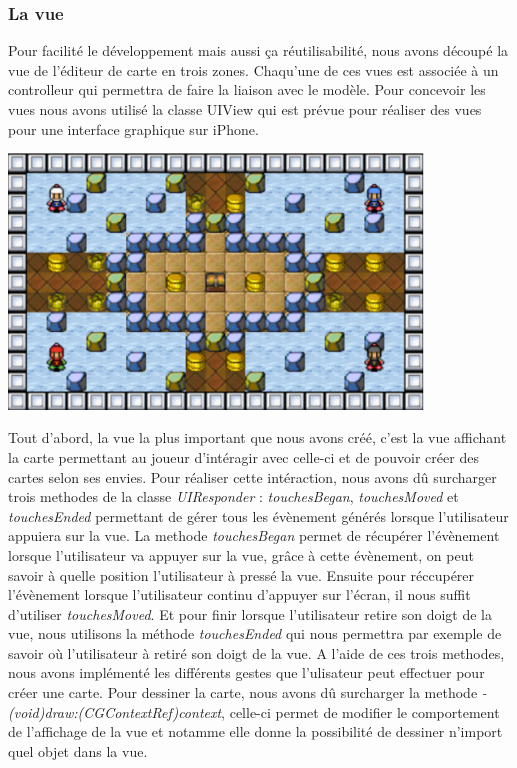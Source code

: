 	\subsubsection{La vue}
		Pour facilité le développement mais aussi ça réutilisabilité, nous avons découpé la vue de l'éditeur de carte en trois zones. Chaqu'une de ces vues est associée à un controlleur qui permettra de faire la liaison avec le modèle. Pour concevoir les vues nous avons utilisé la classe UIView qui est prévue pour réaliser des vues pour une interface graphique sur iPhone. 
			
		\begin{center}
			\includegraphics[width=11cm]{./Developpement/Img/carte.eps}
		\end{center}
		Tout d'abord, la vue la plus important que nous avons créé, c'est la vue affichant la carte permettant au joueur d'intéragir avec celle-ci et de pouvoir créer des cartes selon ses envies. Pour réaliser cette intéraction, nous avons dû surcharger trois methodes de la classe \textit{UIResponder} : \textit{touchesBegan}, \textit{touchesMoved} et \textit{touchesEnded} permettant de gérer tous les évènement générés lorsque l'utilisateur appuiera sur la vue. La methode \textit{touchesBegan} permet de récupérer l'évènement lorsque l'utilisateur va appuyer sur la vue, grâce à cette évènement, on peut savoir à quelle position l'utilisateur à pressé la vue. Ensuite pour réccupérer l'évènement lorsque l'utilisateur continu d'appuyer sur l'écran, il nous suffit d'utiliser \textit{touchesMoved}. Et pour finir lorsque l'utilisateur retire son doigt de la vue, nous utilisons la méthode \textit{touchesEnded} qui nous permettra par exemple de savoir où l'utilisateur à retiré son doigt de la vue. A l'aide de ces trois methodes, nous avons implémenté les différents gestes que l'ulisateur peut effectuer pour créer une carte. Pour dessiner la carte, nous avons dû surcharger la methode \textit{- (void)draw:(CGContextRef)context}, celle-ci permet de modifier le comportement de l'affichage de la vue et notamme elle donne la possibilité de dessiner n'import quel objet dans la vue.
		
